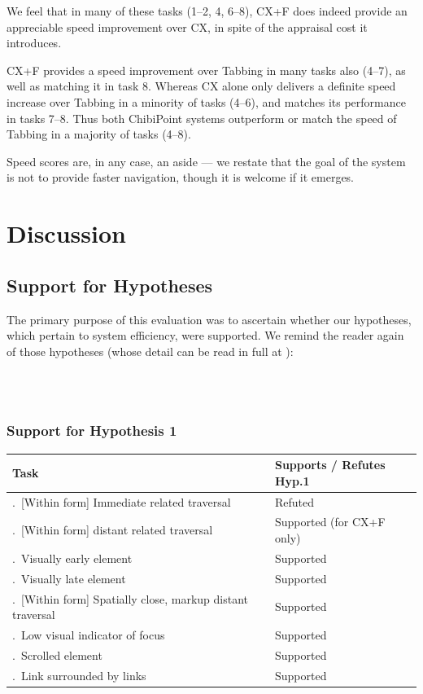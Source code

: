 \documentclass[11pt,openright,a4paper]{report}
\begin{document}
We feel that in many of these tasks (1--2, 4, 6--8), CX+F does indeed provide an appreciable speed improvement over CX, in spite of the appraisal cost it introduces.

CX+F provides a speed improvement over Tabbing in many tasks also (4--7), as well as matching it in task 8. Whereas CX alone only delivers a definite speed increase over Tabbing in a minority of tasks (4--6), and matches its performance in tasks 7--8. Thus both ChibiPoint systems outperform or match the speed of Tabbing in a majority of tasks (4--8).

Speed scores are, in any case, an aside --- we restate that the goal of the system is not to provide faster navigation, though it is welcome if it emerges.

\section{Discussion}
\subsection{Support for Hypotheses}
The primary purpose of this evaluation was to ascertain whether our hypotheses, which pertain to system efficiency, were supported. We remind the reader again of those hypotheses (whose detail can be read in full at ):

\textbf{\hypone}\\
\textbf{\hyptwo}\\

\subsubsection{Support for Hypothesis 1}
\newcommand{\tasktablenumber}{\stepcounter{tasktablecounter}\arabic{tasktablecounter}.~}
\begin{tabular}{l l}
\hline\hline %
Task & Supports / Refutes Hyp.1 \\ [0.5ex] %
\hline %
\tasktablenumber [Within form] Immediate related traversal & Refuted\\ \relax
\tasktablenumber [Within form] distant related traversal & Supported (for CX+F only)\\ \relax
\tasktablenumber Visually early element & Supported\\ \relax
\tasktablenumber Visually late element & Supported\\ \relax
\tasktablenumber [Within form] Spatially close, markup distant traversal & Supported\\ \relax
\tasktablenumber Low visual indicator of focus & Supported\\ \relax
\tasktablenumber Scrolled element & Supported\\ \relax
\tasktablenumber Link surrounded by links & Supported\\ [1ex] %
\hline %
\end{tabular}
\end{document}
